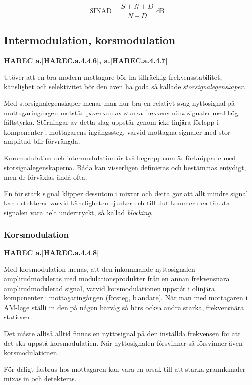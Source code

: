 \[
\text{SINAD} = \frac{S+N+D}{N+D}\text{ dB}
\]

\subsection{Intermodulation, korsmodulation}
\textbf{HAREC
  a.\ref{HAREC.a.4.4.6}\label{myHAREC.a.4.4.6},
  a.\ref{HAREC.a.4.4.7}\label{myHAREC.a.4.4.7}
}
\label{intermodulation}

Utöver att en bra modern mottagare bör ha tillräcklig frekvensstabilitet,
känslighet och selektivitet bör den även ha goda så kallade
\emph{storsignalegenskaper}.

Med storsignalegenskaper menar man hur bra en relativt svag nyttosignal på
mottagaringången motstår påverkan av starka frekvens nära signaler med hög
fältstyrka.
Störningar av detta slag uppstår genom icke linjära förlopp i komponenter i
mottagarens ingångssteg, varvid mottagna signaler med stor amplitud blir
förvrängda.

Korsmodulation och intermodulation är två begrepp som är förknippade
med storsignalegenskaperna.
Båda kan visserligen definieras och bestämmas entydigt, men de förväxlas ändå
ofta.

En för stark signal klipper dessutom i mixrar och detta gör att allt mindre
signal kan detekteras varvid känsligheten sjunker och till slut kommer den
tänkta signalen vara helt undertryckt, så kallad \emph{blocking}.

\subsubsection{Korsmodulation}
\textbf{HAREC
  a.\ref{HAREC.a.4.4.8}\label{myHAREC.a.4.4.8}
}

Med korsmodulation menas, att den inkommande nyttosignalen amplitudmoduleras
med modulationsprodukter från en annan frekvensnära amplitudmodulerad signal,
varvid korsmodulationen uppstår i olinjära komponenter i mottagaringången
(försteg, blandare).
När man med mottagaren i AM-läge ställt in den på någon bärvåg så hörs också
andra starka, frekvensnära stationer.

Det måste alltså alltid finnas en nyttosignal på den inställda frekvensen för
att det ska uppstå korsmodulation.
När nyttosignalen försvinner så försvinner även korsmodulationen.

För dåligt fasbrus hos mottagaren kan vara en orsak till att starka
grannkanaler mixas in och detekteras.


